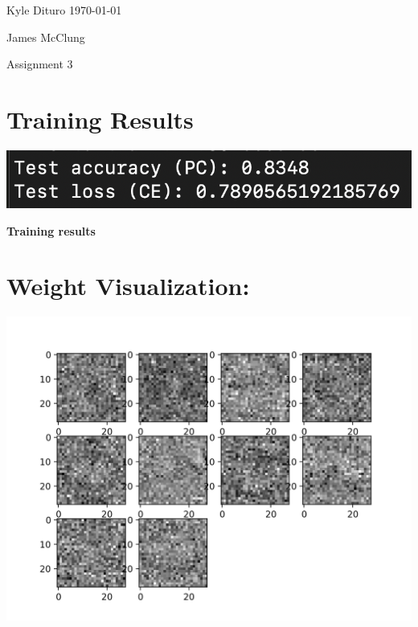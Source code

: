 \documentclass[12pt, letterpaper, notitlepage, twoside]{article}
\theoremstyle{definition}
\theoremstyle{plain}
\begin{document}
Kyle Dituro \hfill \today

James McClung
\begin{center}
{\huge Assignment 3}
\end{center}

\section{Training Results}
\begin{center}
    \includegraphics{Imgs/results.png}

    \textbf{Training results}
\end{center}

\section{Weight Visualization:}
\begin{center}
    \includegraphics{Imgs/Wgray.png}
\end{center}
\end{document}
